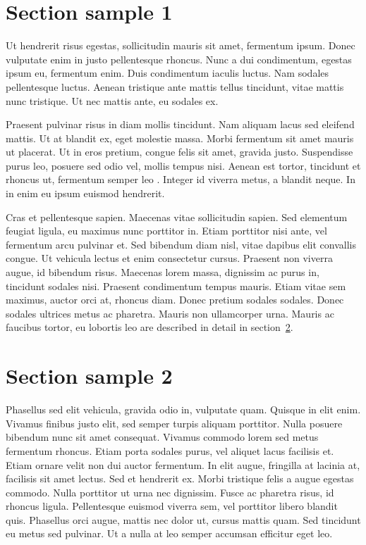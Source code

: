 \section{Section sample 1}

Ut hendrerit risus egestas, sollicitudin mauris sit amet, fermentum ipsum. Donec vulputate enim in justo pellentesque rhoncus. Nunc a dui condimentum, egestas ipsum eu, fermentum enim. Duis condimentum iaculis luctus. Nam sodales pellentesque luctus. Aenean tristique ante mattis tellus tincidunt, vitae mattis nunc tristique. Ut nec mattis ante, eu sodales ex.

Praesent pulvinar risus in diam mollis tincidunt. Nam aliquam lacus sed eleifend mattis. Ut at blandit ex, eget molestie massa. Morbi fermentum sit amet mauris ut placerat. Ut in eros pretium, congue felis sit amet, gravida justo. Suspendisse purus leo, posuere sed odio vel, mollis tempus nisi. Aenean est tortor, tincidunt et rhoncus ut, fermentum semper leo \cite{book-crossref}. Integer id viverra metus, a blandit neque. In in enim eu ipsum euismod hendrerit.

Cras et pellentesque sapien. Maecenas vitae sollicitudin sapien. Sed elementum feugiat ligula, eu maximus nunc porttitor in. Etiam porttitor nisi ante, vel fermentum arcu pulvinar et. Sed bibendum diam nisl, vitae dapibus elit convallis congue. Ut vehicula lectus et enim consectetur cursus. Praesent non viverra augue, id bibendum risus. Maecenas lorem massa, dignissim ac purus in, tincidunt sodales nisi. Praesent condimentum tempus mauris. Etiam vitae sem maximus, auctor orci at, rhoncus diam. Donec pretium sodales sodales. Donec sodales ultrices metus ac pharetra. Mauris non ullamcorper urna. Mauris ac faucibus tortor, eu lobortis leo are described in detail in section~\ref{ch1:sec}.

\section{Section sample 2}\label{ch1:sec}

Phasellus sed elit vehicula, gravida odio in, vulputate quam. Quisque in elit enim. Vivamus finibus justo elit, sed semper turpis aliquam porttitor. Nulla posuere bibendum nunc sit amet consequat. Vivamus commodo lorem sed metus fermentum rhoncus. Etiam porta sodales purus, vel aliquet lacus facilisis et. Etiam ornare velit non dui auctor fermentum. In elit augue, fringilla at lacinia at, facilisis sit amet lectus. Sed et hendrerit ex. Morbi tristique felis a augue egestas commodo. Nulla porttitor ut urna nec dignissim. Fusce ac pharetra risus, id rhoncus ligula. Pellentesque euismod viverra sem, vel porttitor libero blandit quis. Phasellus orci augue, mattis nec dolor ut, cursus mattis quam. Sed tincidunt eu metus sed pulvinar. Ut a nulla at leo semper accumsan efficitur eget leo.

